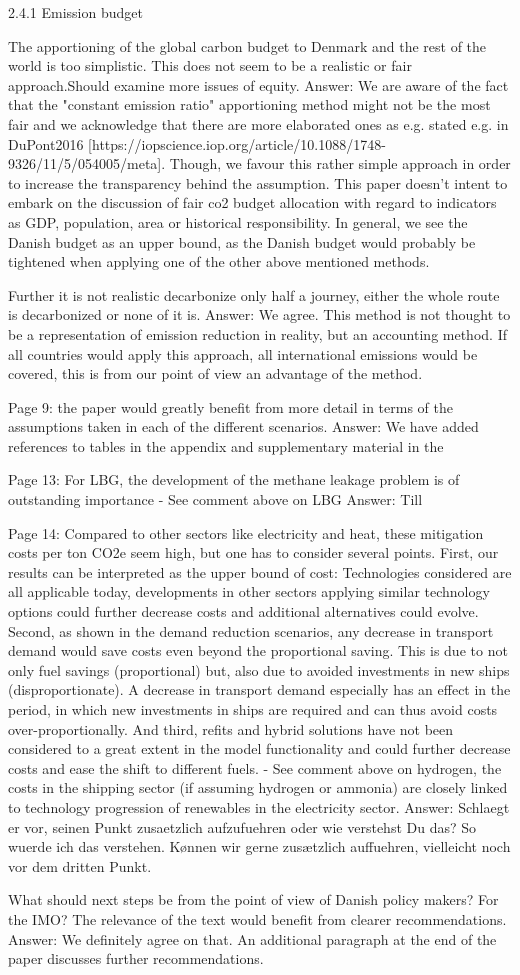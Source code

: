 2.4.1 Emission budget

The apportioning of the global carbon budget to Denmark and the rest of the world is too simplistic. This does not seem to be a realistic or fair approach.Should examine more issues of equity. 
Answer: We are aware of the fact that the "constant emission ratio" apportioning method might not be the most fair and we acknowledge that there are more elaborated ones as e.g. stated e.g. in DuPont2016 [https://iopscience.iop.org/article/10.1088/1748-9326/11/5/054005/meta]. Though, we favour this rather simple approach in order to increase the transparency behind the assumption. This paper doesn't intent to embark on the discussion of fair co2 budget allocation with regard to indicators as GDP, population, area or historical responsibility. In general, we see the Danish budget as an upper bound, as the Danish budget would probably be tightened when applying one of the other above mentioned methods.

Further it is not realistic decarbonize only half a journey, either the whole route is decarbonized or none of it is.
Answer: We agree. This method is not thought to be a representation of emission reduction in reality, but an accounting method. If all countries would apply this approach, all international emissions would be covered, this is from our point of view an advantage of the method.

Page 9: the paper would greatly benefit from more detail in terms of the assumptions taken in each of the different scenarios.
Answer: We have added references to tables in the appendix and supplementary material in the

Page 13: For LBG, the development of the methane leakage problem is of outstanding importance
-	See comment above on LBG
Answer: Till

Page 14: Compared to other sectors like electricity and heat, these mitigation costs per ton CO2e seem high, but one has to consider several points. First, our results can be interpreted as the upper bound of cost: Technologies considered are all applicable today, developments in other sectors applying similar technology options could further decrease costs and additional alternatives could evolve. Second, as shown in the demand reduction scenarios, any decrease in transport demand would save costs even beyond the proportional saving. This is due to not only fuel savings (proportional) but, also due to avoided investments in new ships (disproportionate). A decrease in transport demand especially has an effect in the period, in which new investments in ships are required and can thus avoid costs over-proportionally. And third, refits and hybrid solutions have not been considered to a great extent in the model functionality and could further decrease costs and ease the shift to different fuels. 
-	See comment above on hydrogen, the costs in the shipping sector (if assuming hydrogen or ammonia) are closely linked to technology progression of renewables in the electricity sector.
Answer: Schlaegt er vor, seinen Punkt zusaetzlich aufzufuehren oder wie verstehst Du das? So wuerde ich das verstehen. Kønnen wir gerne zusætzlich auffuehren, vielleicht noch vor dem dritten Punkt.

What should next steps be from the point of view of Danish policy makers? For the IMO? The relevance of the text would benefit from clearer recommendations. 
Answer: We definitely agree on that. An additional paragraph at the end of the paper discusses further recommendations.



